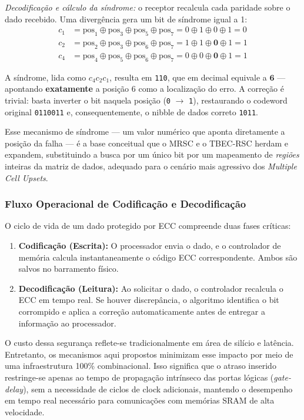 \documentclass[12pt,a4paper]{article}
\begin{document}
\textit{Decodificação e cálculo da síndrome:} o receptor recalcula cada 
paridade sobre o dado recebido. Uma divergência gera um bit de síndrome 
igual a 1:
\begin{align*}
    c_1 &= \text{pos}_1 \oplus \text{pos}_3 \oplus \text{pos}_5 \oplus \text{pos}_7 = 0 \oplus 1 \oplus 0 \oplus 1 = 0 \\
    c_2 &= \text{pos}_2 \oplus \text{pos}_3 \oplus \text{pos}_6 \oplus \text{pos}_7 = 1 \oplus 1 \oplus \mathbf{0} \oplus 1 = 1 \\
    c_4 &= \text{pos}_4 \oplus \text{pos}_5 \oplus \text{pos}_6 \oplus \text{pos}_7 = 0 \oplus 0 \oplus \mathbf{0} \oplus 1 = 1
\end{align*}

A síndrome, lida como $c_4c_2c_1$, resulta em \texttt{110}, que em decimal 
equivale a $\mathbf{6}$ — apontando \textbf{exatamente} a posição 6 como a 
localização do erro. A correção é trivial: basta inverter o bit naquela 
posição (\texttt{0} $\rightarrow$ \texttt{1}), restaurando o codeword 
original \texttt{0110011} e, consequentemente, o nibble de dados correto 
\texttt{1011}.

Esse mecanismo de síndrome — um valor numérico que aponta diretamente a 
posição da falha — é a base conceitual que o MRSC e o TBEC-RSC herdam e 
expandem, substituindo a busca por um único bit por um mapeamento de 
\textit{regiões} inteiras da matriz de dados, adequado para o cenário mais 
agressivo dos \textit{Multiple Cell Upsets}.

\subsubsection{Fluxo Operacional de Codificação e Decodificação}
O ciclo de vida de um dado protegido por ECC compreende duas fases críticas:

\begin{enumerate}
    \item \textbf{Codificação (Escrita):} O processador envia o dado, e o controlador de memória calcula instantaneamente o código ECC correspondente. Ambos são salvos no barramento físico.
    \item \textbf{Decodificação (Leitura):} Ao solicitar o dado, o controlador recalcula o ECC em tempo real. Se houver discrepância, o algoritmo identifica o bit corrompido e aplica a correção automaticamente antes de entregar a informação ao processador.
\end{enumerate}

O custo dessa segurança reflete-se tradicionalmente em área de silício e latência. Entretanto, os mecanismos aqui propostos minimizam esse impacto por meio de uma infraestrutura 100\% combinacional. Isso significa que o atraso inserido restringe-se apenas ao tempo de propagação intrínseco das portas lógicas (\textit{gate-delay}), sem a necessidade de ciclos de clock adicionais, mantendo o desempenho em tempo real necessário para comunicações com memórias SRAM de alta velocidade.
\end{document}
